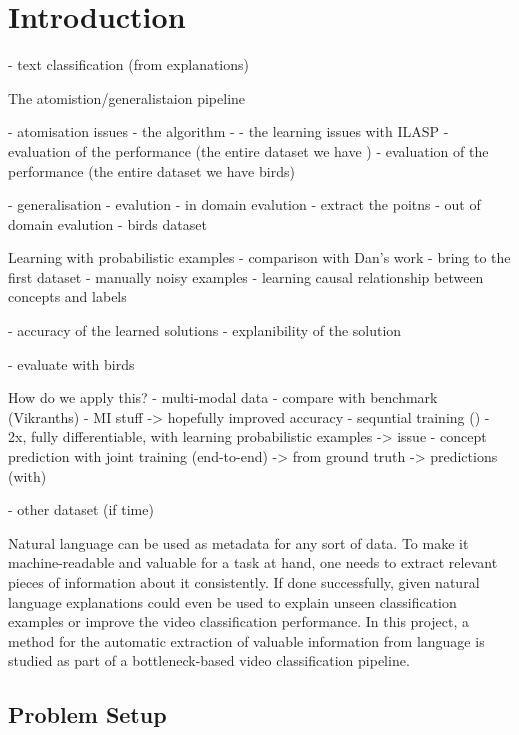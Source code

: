 \chapter{Introduction}
 - text classification (from explanations)

The atomistion/generalistaion pipeline

 - atomisation issues
    - the algorithm
      - 
    - the learning issues with ILASP
    - evaluation of the performance (the entire dataset we have )
    - evaluation of the performance (the entire dataset we have birds)
    
  - generalisation 
    - evalution
      - in domain evalution - extract the poitns
      - out of domain evalution - birds dataset
      
Learning with probabilistic examples 
  - comparison with Dan's work
  - bring to the first dataset  - manually noisy examples
        - learning causal relationship between concepts and labels
        
  - accuracy of the learned solutions
  - explanibility of the solution
  
  - evaluate with birds 


How do we apply this?
 - multi-modal data
 - compare with benchmark (Vikranths)
    - MI stuff -> hopefully improved accuracy - sequntial training () - 2x, fully differentiable, with learning probabilistic examples
       -> issue - concept prediction with joint training (end-to-end)
       -> from ground truth -> predictions (with)
       
  - other dataset (if time)
  
      


Natural language can be used as metadata for any sort of data.
To make it machine-readable and valuable for a task at hand, one needs to extract relevant pieces of information about it consistently.
If done successfully, given natural language explanations could even be used to explain unseen classification examples or improve the video classification performance.
In this project, a method for the automatic extraction of valuable information from language is studied as part of a bottleneck-based video classification pipeline.





\section{Problem Setup}

